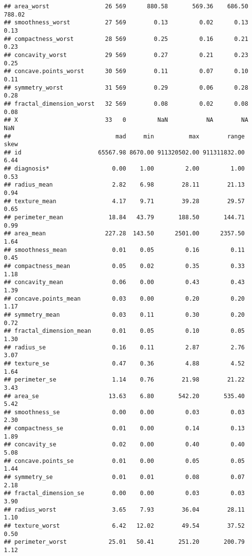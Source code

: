 \documentclass[
]{article}
\begin{document}
\begin{verbatim}
## area_worst                26 569      880.58       569.36    686.50     788.02
## smoothness_worst          27 569        0.13         0.02      0.13       0.13
## compactness_worst         28 569        0.25         0.16      0.21       0.23
## concavity_worst           29 569        0.27         0.21      0.23       0.25
## concave.points_worst      30 569        0.11         0.07      0.10       0.11
## symmetry_worst            31 569        0.29         0.06      0.28       0.28
## fractal_dimension_worst   32 569        0.08         0.02      0.08       0.08
## X                         33   0         NaN           NA        NA        NaN
##                              mad     min          max        range skew
## id                      65567.98 8670.00 911320502.00 911311832.00 6.44
## diagnosis*                  0.00    1.00         2.00         1.00 0.53
## radius_mean                 2.82    6.98        28.11        21.13 0.94
## texture_mean                4.17    9.71        39.28        29.57 0.65
## perimeter_mean             18.84   43.79       188.50       144.71 0.99
## area_mean                 227.28  143.50      2501.00      2357.50 1.64
## smoothness_mean             0.01    0.05         0.16         0.11 0.45
## compactness_mean            0.05    0.02         0.35         0.33 1.18
## concavity_mean              0.06    0.00         0.43         0.43 1.39
## concave.points_mean         0.03    0.00         0.20         0.20 1.17
## symmetry_mean               0.03    0.11         0.30         0.20 0.72
## fractal_dimension_mean      0.01    0.05         0.10         0.05 1.30
## radius_se                   0.16    0.11         2.87         2.76 3.07
## texture_se                  0.47    0.36         4.88         4.52 1.64
## perimeter_se                1.14    0.76        21.98        21.22 3.43
## area_se                    13.63    6.80       542.20       535.40 5.42
## smoothness_se               0.00    0.00         0.03         0.03 2.30
## compactness_se              0.01    0.00         0.14         0.13 1.89
## concavity_se                0.02    0.00         0.40         0.40 5.08
## concave.points_se           0.01    0.00         0.05         0.05 1.44
## symmetry_se                 0.01    0.01         0.08         0.07 2.18
## fractal_dimension_se        0.00    0.00         0.03         0.03 3.90
## radius_worst                3.65    7.93        36.04        28.11 1.10
## texture_worst               6.42   12.02        49.54        37.52 0.50
## perimeter_worst            25.01   50.41       251.20       200.79 1.12

\end{verbatim}
\end{document}
